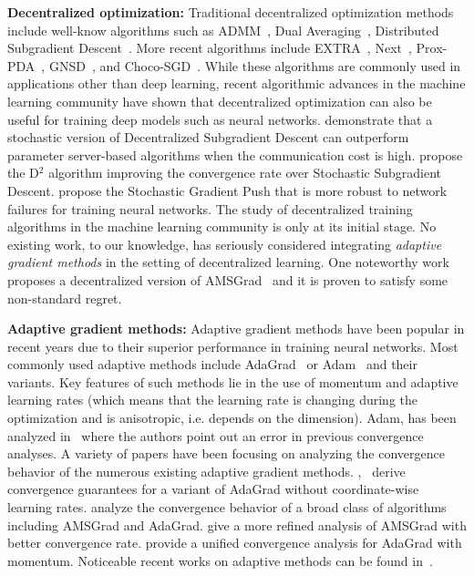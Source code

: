 \documentclass[anon,12pt]{colt2021} %
\begin{document}
\textbf{Decentralized optimization:} 
Traditional decentralized optimization methods include well-know algorithms such as ADMM~\citep{boyd2011distributed}, Dual Averaging~\citep{duchi2011dual}, Distributed Subgradient Descent~\citep{nedic2009distributed}. 
More recent algorithms include EXTRA~\citep{shi2015extra}, Next~\citep{di2016next}, Prox-PDA~\citep{hong2017prox}, GNSD~\citep{lu2019gnsd}, and Choco-SGD~\citep{koloskova2019decentralized}.  
While these algorithms are commonly used in applications other than deep learning, recent algorithmic advances in the machine learning community have shown that decentralized optimization can also be useful for training deep models such as neural networks. 
\cite{lian2017can} demonstrate that a stochastic version of Decentralized Subgradient Descent can outperform parameter server-based algorithms when the communication cost is high. 
\cite{tang2018d} propose the D$^2$ algorithm improving the convergence rate over Stochastic Subgradient Descent.
\cite{assran2019stochastic} propose the Stochastic Gradient Push that is more robust to network failures for training neural networks. 
The study of decentralized training algorithms in the machine learning community is only at its initial stage. 
No existing work, to our knowledge, has seriously considered integrating \emph{adaptive gradient methods} in the setting of decentralized learning.
One noteworthy work~\citep{nazari2019dadam} proposes a decentralized version of AMSGrad~\citep{reddi2019convergence} and it is proven to satisfy some non-standard regret.

\noindent \textbf{Adaptive gradient methods:}  
Adaptive gradient methods have been popular in recent years due to their superior performance in training neural networks. 
Most commonly used adaptive methods include AdaGrad~\citep{duchi2011adaptive} or Adam~\citep{kingma2014adam} and their variants.  
Key features of such methods lie in the use of momentum and adaptive learning rates (which means that the learning rate is changing during the optimization and is anisotropic, i.e. depends on the dimension).
Adam, has been analyzed in~\cite{reddi2019convergence} where the authors point out an error in previous convergence analyses. 
A variety of papers have been focusing on analyzing the convergence behavior of the numerous existing adaptive gradient methods. 
\cite{ward2019adagrad},~\cite{li2019convergence} derive convergence guarantees for a variant of AdaGrad without coordinate-wise learning rates. 
\cite{chen2018convergence} analyze the convergence behavior of a broad class of algorithms including AMSGrad and AdaGrad. 
\cite{zhou2018convergence} give a more refined analysis of AMSGrad with better convergence rate.
\cite{zou2018convergence} provide a unified convergence analysis for AdaGrad with momentum.
Noticeable recent works on adaptive methods can be found in~\cite{agarwal2019efficient,luo2019adaptive,zaheer2018adaptive}.  
\end{document}
